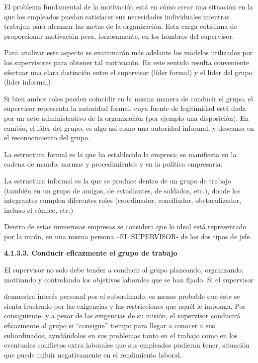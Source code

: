 El problema fundamental de la motivación está en cómo crear una situación en la que los empleados puedan satisfacer sus necesidades individuales mientras trabajan para alcanzar las metas de la organización. Esta carga cotidiana de proporcionar motivación pesa, forzosamente, en los hombros del supervisor.

Para analizar este aspecto se examinarán más adelante los modelos utilizados por los supervisores para obtener tal motivación. En este sentido resulta conveniente efectuar una clara distinción entre el supervisor (líder formal) y el líder del grupo (líder informal)

Si bien ambos roles pueden coincidir en la misma manera de conducir el grupo, el supervisor representa la autoridad formal, cuya fuente de legitimidad está dada por un acto administrativo de la organización (por ejemplo una disposición). En cambio, el líder del grupo, es algo así como una autoridad informal, y descansa en el reconocimiento del grupo.

La estructura formal es la que ha establecido la empresa; se manifiesta en la cadena de mando, normas y procedimientos y en la política empresaria.

La estructura informal es la que se produce dentro de un grupo de trabajo (también en un grupo de amigos, de estudiantes, de soldados, etc.), donde los integrantes cumplen diferentes roles (coordinador, conciliador, obstaculizador, incluso el cómico, etc.)

Dentro de estas numerosas empresas se considera que lo ideal está representado por la unión, en una misma persona –EL SUPERVISOR- de los dos tipos de jefe.

\textbf{4.1.3.3. Conducir eficazmente el grupo de trabajo}

El supervisor no solo debe tender a conducir al grupo planeando, organizando, motivando y controlando los objetivos laborales que se han fijado. Si el supervisor



demuestra interés personal por el subordinado, es menos probable que éste se sienta frustrado por las exigencias y las restricciones que aquél le imponga. Por consiguiente, y a pesar de las exigencias de su misión, el supervisor conducirá eficazmente al grupo si “consigue” tiempo para llegar a conocer a sus subordinados, ayudándolos en sus problemas tanto en el trabajo como en los eventuales conflictos extra laborales que sus empleados pudieran tener, situación que puede influir negativamente en el rendimiento laboral.

